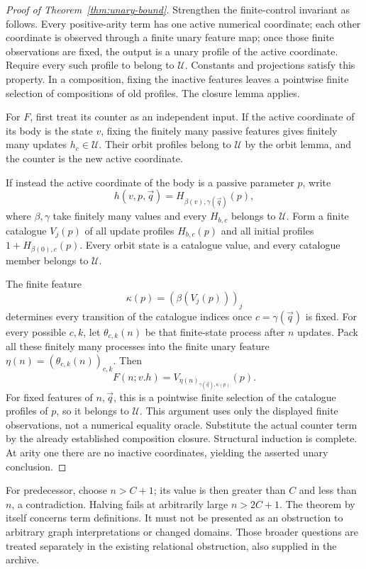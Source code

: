 \documentclass[11pt]{article}
\theoremstyle{definition}
\begin{document}
\begin{proof}[Proof of Theorem~\ref{thm:unary-bound}]
Strengthen the finite-control invariant as follows. Every positive-arity
term has one active numerical coordinate; each other coordinate is observed
through a finite unary feature map; once those finite observations are fixed,
the output is a unary profile of the active coordinate. Require every such
profile to belong to $\mathcal U$. Constants and projections satisfy this
property. In a composition, fixing the inactive features leaves a pointwise
finite selection of compositions of old profiles. The closure lemma applies.

For $F$, first treat its counter as an independent input. If the active
coordinate of its body is the state $v$, fixing the finitely many passive
features gives finitely many updates $h_c\in\mathcal U$. Their orbit profiles
belong to $\mathcal U$ by the orbit lemma, and the counter is the new active
coordinate.

If instead the active coordinate of the body is a passive parameter $p$,
write
\[
 h(v,p,\vec q)=H_{\beta(v),\gamma(\vec q)}(p),
\]
where $\beta,\gamma$ take finitely many values and every $H_{b,c}$ belongs
to $\mathcal U$. Form a finite catalogue $V_j(p)$ of all update profiles
$H_{b,c}(p)$ and all initial profiles $1+H_{\beta(0),c}(p)$. Every orbit
state is a catalogue value, and every catalogue member belongs to
$\mathcal U$.

The finite feature
\[
 \kappa(p)=(\beta(V_j(p)))_j
\]
determines every transition of the catalogue indices once
$c=\gamma(\vec q)$ is fixed. For every possible $c,k$, let
$\theta_{c,k}(n)$ be that finite-state process after $n$ updates. Pack all
these finitely many processes into the finite unary feature
$\eta(n)=(\theta_{c,k}(n))_{c,k}$. Then
\[
 F(n;v.h)=V_{\eta(n)_{\gamma(\vec q),\kappa(p)}}(p).
\]
For fixed features of $n,\vec q$, this is a pointwise finite selection of
the catalogue profiles of $p$, so it belongs to $\mathcal U$. This argument
uses only the displayed finite observations, not a numerical equality
oracle. Substitute the actual counter term by the already established
composition closure. Structural induction is complete. At arity one there
are no inactive coordinates, yielding the asserted unary conclusion.
\end{proof}

For predecessor, choose $n>C+1$; its value is then greater than $C$ and less
than $n$, a contradiction. Halving fails at arbitrarily large $n>2C+1$.
The theorem by itself concerns term definitions. It must not be presented
as an obstruction to arbitrary graph interpretations or changed domains.
Those broader questions are treated separately in the existing relational
obstruction, also supplied in the archive.
\end{document}
